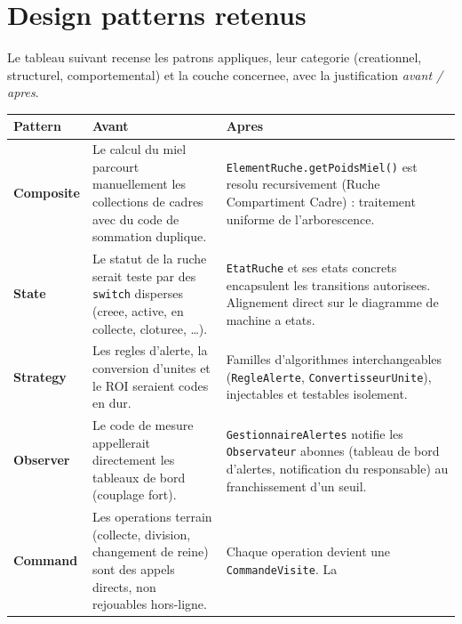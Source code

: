 \section{Design patterns retenus}
Le tableau suivant recense les patrons appliques, leur categorie (creationnel,
structurel, comportemental) et la couche concernee, avec la justification
\emph{avant / apres}.

\begin{xltabular}{\textwidth}{>{\bfseries}p{2.7cm} p{5.9cm} X}
\toprule
\textbf{Pattern} & \textbf{Avant} & \textbf{Apres} \\
\midrule
\endhead
Composite  &
Le calcul du miel parcourt manuellement les collections de cadres avec du code
de sommation duplique. &
\texttt{ElementRuche.getPoidsMiel()} est resolu recursivement
(Ruche \textrightarrow{} Compartiment \textrightarrow{} Cadre) : traitement
uniforme de l'arborescence. \\
State  &
Le statut de la ruche serait teste par des \texttt{switch} disperses (creee,
active, en collecte, cloturee, \ldots). &
\texttt{EtatRuche} et ses etats concrets encapsulent les transitions autorisees.
Alignement direct sur le diagramme de machine a etats. \\
Strategy  &
Les regles d'alerte, la conversion d'unites et le ROI seraient codes en dur. &
Familles d'algorithmes interchangeables (\texttt{RegleAlerte},
\texttt{ConvertisseurUnite}), injectables et testables isolement. \\
Observer  &
Le code de mesure appellerait directement les tableaux de bord (couplage fort). &
\texttt{GestionnaireAlertes} notifie les \texttt{Observateur} abonnes (tableau
de bord d'alertes, notification du responsable) au franchissement d'un seuil. \\
Command  &
Les operations terrain (collecte, division, changement de reine) sont des appels
directs, non rejouables hors-ligne. &
Chaque operation devient une \texttt{CommandeVisite}. La

\end{xltabular}
